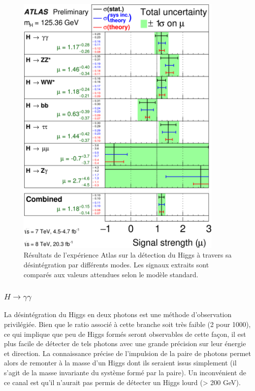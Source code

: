 \documentclass[11pt]{article} %
\begin{document}
\begin{figure}[H]
\centering
  \caption{Résultats de l'expérience Atlas sur la détection du Higgs à travers sa désintégration par différents modes. Les signaux extraits sont comparés aux valeurs attendues selon le modèle standard. }
 \includegraphics[width=0.9\textwidth]{../images/fig_02.png}
\end{figure}


\subsubsection{$H \to \gamma \gamma$}

La désintégration du Higgs en deux photons est une méthode d'observation privilégiée. Bien que le ratio associé à cette branche soit très faible (2 pour 1000), ce qui implique que peu de Higgs formés seront observables de cette façon, il est plus facile de détecter de tels photons avec une grande précision sur leur énergie et direction. La connaissance précise de l'impulsion de la paire de photons permet alors de remonter à la masse d'un Higgs dont ils seraient issus simplement (il s'agit de la masse invariante du système formé par la paire). Un inconvénient de ce canal est qu'il n'aurait pas permis de détecter un Higgs lourd (> 200 GeV).
\end{document}
